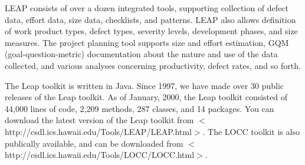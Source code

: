 LEAP consists of over a dozen integrated tools, supporting collection of
defect data, effort data, size data, checklists, and patterns.  LEAP also
allows definition of work product types, defect types, severity levels,
development phases, and size measures. The project planning tool supports
size and effort estimation, GQM (goal-question-metric) \cite{Basili84}
documentation about the nature and use of the data collected, and various
analyses concerning productivity, defect rates, and so forth.

The Leap toolkit is written in Java. Since 1997, we have made over 30 public
releases of the Leap toolkit. As of January, 2000, the Leap toolkit consisted
of 44,000 lines of code, 2,209 methods, 287 classes, and 14 packages.  You can
download the latest version of the Leap toolkit from
$<$http://csdl.ics.hawaii.edu/\linebreak[0]Tools/LEAP/LEAP.html$>$.  The
LOCC toolkit is also publically available, and can be downloaded from 
$<$http://csdl.ics.hawaii.edu/\linebreak[0]Tools/LOCC/LOCC.html$>$.


%


 

